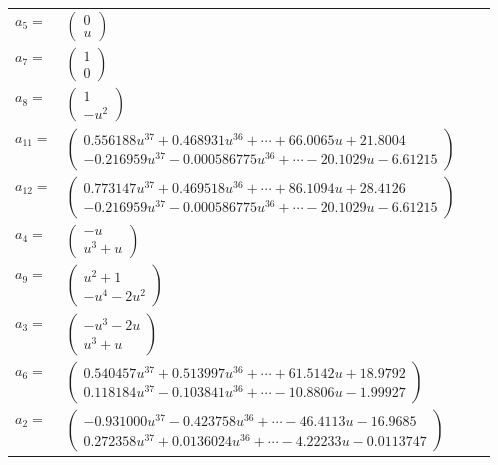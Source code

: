\documentclass[1p]{elsarticle_modified}
\theoremstyle{definition}
\begin{document}
\begin{tabular}{m{7pt} m{180pt} m{7pt} m{180pt} }
\flushright $a_{5}=$&$\begin{pmatrix}0\\u\end{pmatrix}$ \\
\flushright $a_{7}=$&$\begin{pmatrix}1\\0\end{pmatrix}$ \\
\flushright $a_{8}=$&$\begin{pmatrix}1\\- u^2\end{pmatrix}$ \\
\flushright $a_{11}=$&$\begin{pmatrix}0.556188 u^{37}+0.468931 u^{36}+\cdots+66.0065 u+21.8004\\-0.216959 u^{37}-0.000586775 u^{36}+\cdots-20.1029 u-6.61215\end{pmatrix}$ \\
\flushright $a_{12}=$&$\begin{pmatrix}0.773147 u^{37}+0.469518 u^{36}+\cdots+86.1094 u+28.4126\\-0.216959 u^{37}-0.000586775 u^{36}+\cdots-20.1029 u-6.61215\end{pmatrix}$ \\
\flushright $a_{4}=$&$\begin{pmatrix}- u\\u^3+u\end{pmatrix}$ \\
\flushright $a_{9}=$&$\begin{pmatrix}u^2+1\\- u^4-2 u^2\end{pmatrix}$ \\
\flushright $a_{3}=$&$\begin{pmatrix}- u^3-2 u\\u^3+u\end{pmatrix}$ \\
\flushright $a_{6}=$&$\begin{pmatrix}0.540457 u^{37}+0.513997 u^{36}+\cdots+61.5142 u+18.9792\\0.118184 u^{37}-0.103841 u^{36}+\cdots-10.8806 u-1.99927\end{pmatrix}$ \\
\flushright $a_{2}=$&$\begin{pmatrix}-0.931000 u^{37}-0.423758 u^{36}+\cdots-46.4113 u-16.9685\\0.272358 u^{37}+0.0136024 u^{36}+\cdots-4.22233 u-0.0113747\end{pmatrix}$ \\

\end{tabular}
\end{document}
